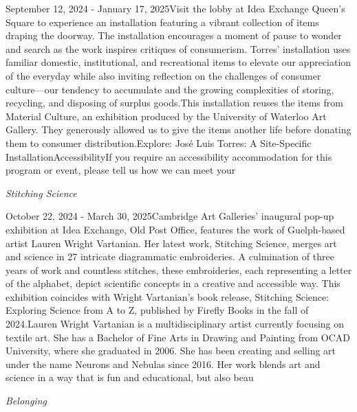 \documentclass[letterpaper, 10pt]{article}
\newcommand{\subtitle}[1]{\textit{\large #1}\vspace{0.5em}}
\newcommand{\articlecontent}[1]{\small #1\vspace{1em}}
\begin{document}
\begin{multicols}{2}
{September 12, 2024 - January 17, 2025Visit the lobby at Idea Exchange Queen's Square to experience an installation featuring a vibrant collection of items draping the doorway. The installation encourages a moment of pause to wonder and search as the work inspires critiques of consumerism. Torres’ installation uses familiar domestic, institutional, and recreational items to elevate our appreciation of the everyday while also inviting reflection on the challenges of consumer culture—our tendency to accumulate and the growing complexities of storing, recycling, and disposing of surplus goods.This installation reuses the items from Material Culture, an exhibition produced by the University of Waterloo Art Gallery. They generously allowed us to give the items another life before donating them to consumer distribution.Explore: José Luis Torres: A Site-Specific InstallationAccessibilityIf you require an accessibility accommodation for this program or event, please tell us how we can meet your
}
\vspace{10px}

\subtitle{Stitching Science}

\articlecontent{

\qrcode[height=1.5cm]{https://ideaexchange.libnet.info/event/12111008}
\vspace{10px}

October 22, 2024 - March 30, 2025Cambridge Art Galleries' inaugural pop-up exhibition at Idea Exchange, Old Post Office, features the work of Guelph-based artist Lauren Wright Vartanian. Her latest work, Stitching Science, merges art and science in 27 intricate diagrammatic embroideries. A culmination of three years of work and countless stitches, these embroideries, each representing a letter of the alphabet, depict scientific concepts in a creative and accessible way. This exhibition coincides with Wright Vartanian’s book release, Stitching Science: Exploring Science from A to Z, published by Firefly Books in the fall of 2024.Lauren Wright Vartanian is a multidisciplinary artist currently focusing on textile art. She has a Bachelor of Fine Arts in Drawing and Painting from OCAD University, where she graduated in 2006. She has been creating and selling art under the name Neurons and Nebulas since 2016. Her work blends art and science in a way that is fun and educational, but also beau
}
\vspace{10px}

\subtitle{Belonging}

\articlecontent{

}
\end{multicols}
\end{document}
